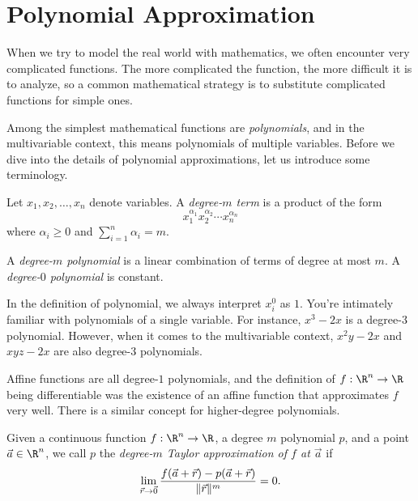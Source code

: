 \begin{exercises}
\end{exercises}

\section{Polynomial Approximation}

When we try to model the real world with mathematics, we often
encounter very complicated functions.  The more complicated
the function, the more difficult it is to analyze, so a common mathematical
strategy is to substitute complicated functions for simple ones.

Among the simplest mathematical functions are \emph{polynomials}, and in the
multivariable context, this means polynomials of multiple variables.
Before we dive into the details of polynomial approximations, let us
introduce some terminology.

\begin{definition}[Polynomial]
	Let $x_1,x_2,\ldots,x_n$ denote variables.  A \emph{degree-$m$ term}
	is a product of the form
	\[
		x_1^{\alpha_1}x_2^{\alpha_2}\cdots x_n^{\alpha_n}
	\]
	where $\alpha_i\geq 0$ and $\sum_{i=1}^n \alpha_i = m$.

	A \emph{degree-$m$ polynomial} is a linear combination
	of terms of degree at most $m$.  A \emph{degree-$0$ polynomial} is constant.
\end{definition}

In the definition of polynomial, we always interpret $x_i^{0}$ as $1$.  You're intimately
familiar with polynomials of a single variable.  For instance, $x^3-2x$ is a degree-$3$ 
polynomial.  However, when it comes to the multivariable context, $x^2y-2x$ and $xyz-2x$ are
also degree-$3$ polynomials.

Affine functions are all degree-$1$ polynomials, and the definition of 
$f:\R^n\to\R$ being differentiable
was the existence of an affine function that approximates $f$ very well.
There is a similar concept for higher-degree polynomials.

\begin{definition}
	Given a continuous
	function $f:\R^n\to\R$, a degree $m$ polynomial $p$, and a point 
	$\vec a\in\R^n$, we
	call $p$ the \emph{degree-$m$ Taylor approximation of $f$ at $\vec a$} if
	\[
		\lim_{\vec r\to \vec 0} \frac{f(\vec a+\vec r)-p(\vec a+\vec r)}{\lVert\vec r\rVert^m}=0.
	\]
\end{definition}

